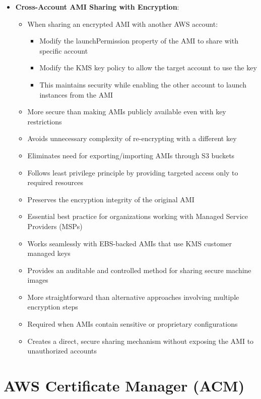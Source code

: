 \documentclass[11pt,a4paper]{report}
\begin{document}
\begin{itemize}
  \item \textbf{Cross-Account AMI Sharing with Encryption}:
\begin{itemize}
  \item When sharing an encrypted AMI with another AWS account:
\begin{itemize}
  \item Modify the launchPermission property of the AMI to share with specific account
  \item Modify the KMS key policy to allow the target account to use the key
  \item This maintains security while enabling the other account to launch instances from the AMI
\end{itemize}
  \item More secure than making AMIs publicly available even with key restrictions
  \item Avoids unnecessary complexity of re-encrypting with a different key
  \item Eliminates need for exporting/importing AMIs through S3 buckets
  \item Follows least privilege principle by providing targeted access only to required resources
  \item Preserves the encryption integrity of the original AMI
  \item Essential best practice for organizations working with Managed Service Providers (MSPs)
  \item Works seamlessly with EBS-backed AMIs that use KMS customer managed keys
  \item Provides an auditable and controlled method for sharing secure machine images
  \item More straightforward than alternative approaches involving multiple encryption steps
  \item Required when AMIs contain sensitive or proprietary configurations
  \item Creates a direct, secure sharing mechanism without exposing the AMI to unauthorized accounts
\end{itemize}
\end{itemize}


\section{AWS Certificate Manager (ACM)}
\end{document}
